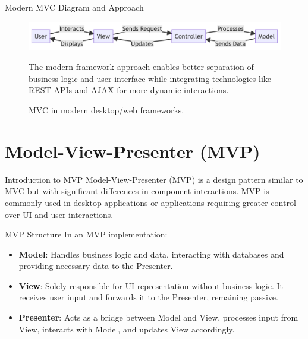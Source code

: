\documentclass[aspectratio=169, table]{beamer}
\begin{document}
\begin{frame}[fragile]{Modern MVC Diagram and Approach}
	\vspace{20pt}
	\begin{figure}[h]
		\centering
		\includegraphics[width=\textwidth]{../images/mvc-modern.png}
		\caption{MVC in modern desktop/web frameworks.}
		\label{fig:mvc-modern}
			The modern framework approach enables better separation of business logic and user interface while integrating technologies like REST APIs and AJAX for more dynamic interactions.
	\end{figure}
\end{frame}

\section{Model-View-Presenter (MVP)}

\begin{frame}[fragile]{Introduction to MVP}
	\vspace{20pt}
	Model-View-Presenter (MVP) is a design pattern similar to MVC but with significant differences in component interactions. 
	MVP is commonly used in desktop applications or applications requiring greater control over UI and user interactions.
\end{frame}

\begin{frame}[fragile]{MVP Structure}
	\vspace{20pt}
	In an MVP implementation:
	\begin{itemize}
		\item \textbf{Model}: Handles business logic and data, interacting with databases and providing necessary data to the Presenter.
		\item \textbf{View}: Solely responsible for UI representation without business logic. It receives user input and forwards it to the Presenter, remaining passive.
		\item \textbf{Presenter}: Acts as a bridge between Model and View, processes input from View, interacts with Model, and updates View accordingly.
	\end{itemize}
\end{frame}
\end{document}
